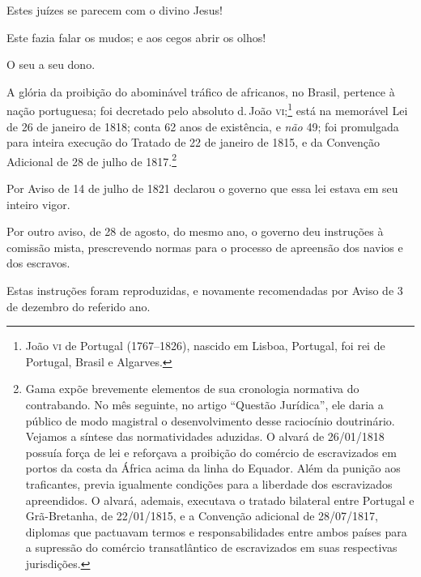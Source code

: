 Estes juízes se parecem com o divino Jesus!

Este fazia falar os mudos; e aos cegos abrir os olhos!

\asterisc

O seu a seu dono.

A glória da proibição do abominável tráfico de africanos, no Brasil,
pertence à nação portuguesa; foi decretado pelo absoluto d.\,João
\textsc{vi};\footnote{João \textsc{vi} de Portugal (1767--1826), nascido em Lisboa,
  Portugal, foi rei de Portugal, Brasil e Algarves.} está na memorável
Lei de 26 de janeiro de 1818; conta 62 anos de existência, e \emph{não}
49; foi promulgada para inteira execução do Tratado de 22 de janeiro de
1815, e da Convenção Adicional de 28 de julho de 1817.\footnote{Gama
  expõe brevemente elementos de sua cronologia normativa do contrabando.
  No mês seguinte, no artigo ``Questão Jurídica'', ele daria a
  público de modo magistral o desenvolvimento desse raciocínio
  doutrinário. Vejamos a síntese das normatividades aduzidas. O alvará
  de 26/01/1818 possuía força de lei e reforçava a proibição do comércio
  de escravizados em portos da costa da África acima da linha do
  Equador. Além da punição aos traficantes, previa igualmente condições
  para a liberdade dos escravizados apreendidos. O alvará, ademais,
  executava o tratado bilateral entre Portugal e Grã-Bretanha, de
  22/01/1815, e a Convenção adicional de 28/07/1817, diplomas que
  pactuavam termos e responsabilidades entre ambos países para a
  supressão do comércio transatlântico de escravizados em suas
  respectivas jurisdições.}

Por Aviso de 14 de julho de 1821 declarou o governo que essa lei estava
em seu inteiro vigor.

Por outro aviso, de 28 de agosto, do mesmo ano, o governo deu instruções
à comissão mista, prescrevendo normas para o processo de apreensão dos
navios e dos escravos.

Estas instruções foram reproduzidas, e novamente recomendadas por Aviso
de 3 de dezembro do referido ano.

